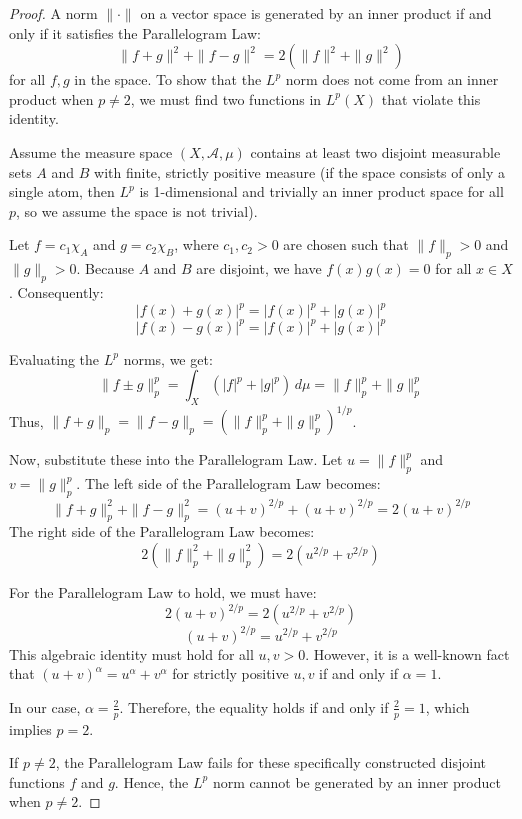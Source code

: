 \documentclass[11pt,en]{elegantpaper}
\begin{document}
\begin{proof}
A norm $\|\cdot\|$ on a vector space is generated by an inner product if and only if it satisfies the Parallelogram Law:
$$\|f + g\|^2 + \|f - g\|^2 = 2(\|f\|^2 + \|g\|^2)$$
for all $f, g$ in the space. To show that the $L^p$ norm does not come from an inner product when $p \neq 2$, we must find two functions in $L^p(X)$ that violate this identity.

Assume the measure space $(X, \mathcal{A}, \mu)$ contains at least two disjoint measurable sets $A$ and $B$ with finite, strictly positive measure (if the space consists of only a single atom, then $L^p$ is 1-dimensional and trivially an inner product space for all $p$, so we assume the space is not trivial).

Let $f = c_1 \chi_A$ and $g = c_2 \chi_B$, where $c_1, c_2 > 0$ are chosen such that $\|f\|_p > 0$ and $\|g\|_p > 0$. Because $A$ and $B$ are disjoint, we have $f(x)g(x) = 0$ for all $x \in X$.
Consequently:
$$|f(x) + g(x)|^p = |f(x)|^p + |g(x)|^p$$
$$|f(x) - g(x)|^p = |f(x)|^p + |g(x)|^p$$

Evaluating the $L^p$ norms, we get:
$$\|f \pm g\|_p^p = \int_X (|f|^p + |g|^p) \, d\mu = \|f\|_p^p + \|g\|_p^p$$
Thus, $\|f + g\|_p = \|f - g\|_p = \left( \|f\|_p^p + \|g\|_p^p \right)^{1/p}$.

Now, substitute these into the Parallelogram Law. Let $u = \|f\|_p^p$ and $v = \|g\|_p^p$. The left side of the Parallelogram Law becomes:
$$\|f + g\|_p^2 + \|f - g\|_p^2 = (u + v)^{2/p} + (u + v)^{2/p} = 2(u + v)^{2/p}$$
The right side of the Parallelogram Law becomes:
$$2(\|f\|_p^2 + \|g\|_p^2) = 2\left( u^{2/p} + v^{2/p} \right)$$

For the Parallelogram Law to hold, we must have:
$$2(u + v)^{2/p} = 2\left( u^{2/p} + v^{2/p} \right)$$
$$(u + v)^{2/p} = u^{2/p} + v^{2/p}$$
This algebraic identity must hold for all $u, v > 0$. However, it is a well-known fact that $(u + v)^\alpha = u^\alpha + v^\alpha$ for strictly positive $u, v$ if and only if $\alpha = 1$. 

In our case, $\alpha = \frac{2}{p}$. Therefore, the equality holds if and only if $\frac{2}{p} = 1$, which implies $p = 2$. 

If $p \neq 2$, the Parallelogram Law fails for these specifically constructed disjoint functions $f$ and $g$. Hence, the $L^p$ norm cannot be generated by an inner product when $p \neq 2$.
\end{proof}
\end{document}
